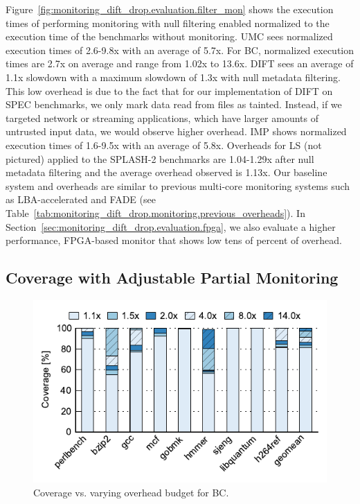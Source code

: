 Figure~\ref{fig:monitoring_dift_drop.evaluation.filter_mon} shows the execution
times of performing monitoring with null filtering enabled normalized to the
execution time of the benchmarks without monitoring. UMC sees normalized
execution times of 2.6-9.8x with an average of 5.7x.  For BC, normalized
execution times are 2.7x on average and range from 1.02x to 13.6x.  DIFT sees
an average of 1.1x slowdown with a maximum slowdown of 1.3x with null metadata
filtering. This low overhead is due to the fact that for our implementation of
DIFT on SPEC benchmarks, we only mark data read from files as tainted. Instead,
if we targeted network or streaming applications, which have larger amounts of
untrusted input data, we would observe higher overhead. IMP shows normalized
execution times of 1.6-9.5x with an average of 5.8x. Overheads for LS (not
pictured) applied to the SPLASH-2 benchmarks are 1.04-1.29x after null metadata
filtering and the average overhead observed is 1.13x.  Our baseline system and
overheads are similar to previous multi-core monitoring systems such as
LBA-accelerated \cite{lba-isca08} and FADE \cite{fade-hpca14} (see
Table~\ref{tab:monitoring_dift_drop.monitoring.previous_overheads}). In
Section~\ref{sec:monitoring_dift_drop.evaluation.fpga}, we also evaluate a
higher performance, FPGA-based monitor that shows low tens of percent of
overhead. 

\subsection{Coverage with Adjustable Partial Monitoring}

\begin{figure}
  \begin{center}
    \includegraphics{monitoring_dift_drop/data/hb_sweep.pdf}
    \caption{Coverage vs. varying overhead budget for BC.}
    \label{fig:monitoring_dift_drop.evaluation.bc_sweep}
  \end{center}
\end{figure}


